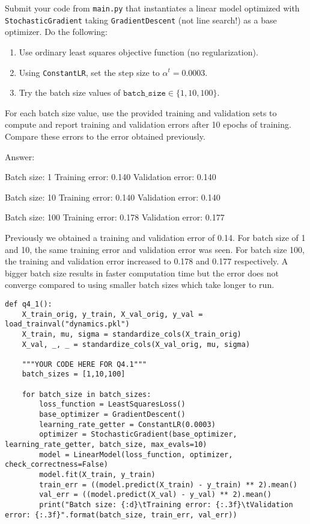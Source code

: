 \documentclass{article}
\newcommand{\blu}[1]{{\textcolor{blu}{#1}}}
\newenvironment{answer}{\par\begingroup\color{gre}Answer: }{\endgroup}
\let\ask\blu
\begin{document}
\ask{Submit your code} from \texttt{main.py} that instantiates a linear model optimized with \texttt{StochasticGradient} taking \texttt{GradientDescent} (not line search!) as a base optimizer. Do the following:
\begin{enumerate}
		\item Use ordinary least squares objective function (no regularization).
		\item Using \texttt{ConstantLR}, set the step size to $\alpha^t = 0.0003$.
		\item Try the batch size values of $\texttt{batch\_size} \in \{1, 10, 100\}$.
\end{enumerate}
\ask{For each batch size value, use the provided training and validation sets to compute and report training and validation errors after 10 epochs of training. Compare these errors to the error obtained previously.}

\begin{answer}

Batch size: 1   Training error: 0.140   Validation error: 0.140

Batch size: 10  Training error: 0.140   Validation error: 0.140

Batch size: 100 Training error: 0.178   Validation error: 0.177

Previously we obtained a training and validation error of 0.14. For batch size of 1 and 10, the same training error and validation error was seen. For batch size 100, the training and validation error increased to 0.178 and 0.177 respectively. A bigger batch size results in faster computation time but the error does not converge compared to using smaller batch sizes which take longer to run. 
\begin{verbatim}
def q4_1():
    X_train_orig, y_train, X_val_orig, y_val = load_trainval("dynamics.pkl")
    X_train, mu, sigma = standardize_cols(X_train_orig)
    X_val, _, _ = standardize_cols(X_val_orig, mu, sigma)

    """YOUR CODE HERE FOR Q4.1"""
    batch_sizes = [1,10,100]
   
    for batch_size in batch_sizes:
        loss_function = LeastSquaresLoss()
        base_optimizer = GradientDescent()
        learning_rate_getter = ConstantLR(0.0003)
        optimizer = StochasticGradient(base_optimizer, learning_rate_getter, batch_size, max_evals=10)
        model = LinearModel(loss_function, optimizer, check_correctness=False)
        model.fit(X_train, y_train)
        train_err = ((model.predict(X_train) - y_train) ** 2).mean()
        val_err = ((model.predict(X_val) - y_val) ** 2).mean()
        print("Batch size: {:d}\tTraining error: {:.3f}\tValidation error: {:.3f}".format(batch_size, train_err, val_err))
\end{verbatim}
\end{answer}
\newpage
\end{document}
